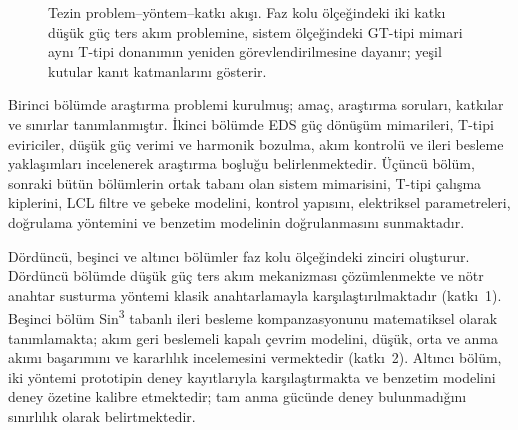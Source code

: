 \begin{figure}[htbp]
{%
  }
  \caption[Tezin problem--yöntem--katkı akışı]{Tezin problem--yöntem--katkı akışı. Faz kolu ölçeğindeki iki katkı düşük güç ters akım problemine, sistem ölçeğindeki GT-tipi mimari aynı T-tipi donanımın yeniden görevlendirilmesine dayanır; yeşil kutular kanıt katmanlarını gösterir.}
  \label{fig:tez-akisi}
\end{figure} Birinci bölümde araştırma problemi kurulmuş; amaç, araştırma soruları, katkılar ve sınırlar tanımlanmıştır. İkinci bölümde EDS güç dönüşüm mimarileri, T-tipi eviriciler, düşük güç verimi ve harmonik bozulma, akım kontrolü ve ileri besleme yaklaşımları incelenerek araştırma boşluğu belirlenmektedir. Üçüncü bölüm, sonraki bütün bölümlerin ortak tabanı olan sistem mimarisini, T-tipi çalışma kiplerini, LCL filtre ve şebeke modelini, kontrol yapısını, elektriksel parametreleri, doğrulama yöntemini ve benzetim modelinin doğrulanmasını sunmaktadır.

Dördüncü, beşinci ve altıncı bölümler faz kolu ölçeğindeki zinciri oluşturur. Dördüncü bölümde düşük güç ters akım mekanizması çözümlenmekte ve nötr anahtar susturma yöntemi klasik anahtarlamayla karşılaştırılmaktadır (katkı~1). Beşinci bölüm Sin\textsuperscript{3} tabanlı ileri besleme kompanzasyonunu matematiksel olarak tanımlamakta; akım geri beslemeli kapalı çevrim modelini, düşük, orta ve anma akımı başarımını ve kararlılık incelemesini vermektedir (katkı~2). Altıncı bölüm, iki yöntemi prototipin deney kayıtlarıyla karşılaştırmakta ve benzetim modelini deney özetine kalibre etmektedir; tam anma gücünde deney bulunmadığını sınırlılık olarak belirtmektedir.

